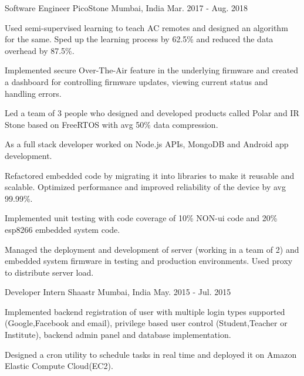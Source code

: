 

\begin{cventries}

	\cventry
	{Software Engineer} %
	{PicoStone} %
	{Mumbai, India} %
	{Mar. 2017 - Aug. 2018} %
	{ \begin{cvitems} %
	\item{Used semi-supervised learning to teach AC remotes and designed an algorithm for the same. Sped up the learning process by 62.5\% and reduced the data overhead by 87.5\%.} %
      \item {Implemented secure Over-The-Air feature in the underlying firmware and created a dashboard for controlling firmware updates, viewing current status and handling errors.}
      \item {Led a team of 3 people who designed and developed products called Polar and IR Stone based on FreeRTOS with avg 50\% data compression.}  %
      \item {As a full stack developer worked on Node.js APIs, MongoDB and Android app development.}    
      \item {Refactored embedded code by migrating it into libraries to make it reusable and scalable. Optimized performance and improved reliability of the device by avg 99.99\%.}  %
      \item {Implemented unit testing with code coverage of 10\% NON-ui code and 20\% esp8266 embedded system code.}
      \item {Managed the deployment and development of server (working in a team of 2) and embedded system firmware in testing and production environments. Used proxy to distribute server load.}
     \end{cvitems}
  }


	\cventry
	{Developer Intern} %
	{Shaastr } %
	{Mumbai, India} %
	{May. 2015 - Jul. 2015} %
	{
		\begin{cvitems} %
			\item {Implemented backend registration of user with multiple login types supported (Google,Facebook and email), privilege based user control (Student,Teacher or Institute), backend admin panel and database implementation.}
			\item {Designed a cron utility to schedule tasks in real time and deployed it on Amazon Elastic Compute Cloud(EC2).}
		\end{cvitems}
	}

\end{cventries}